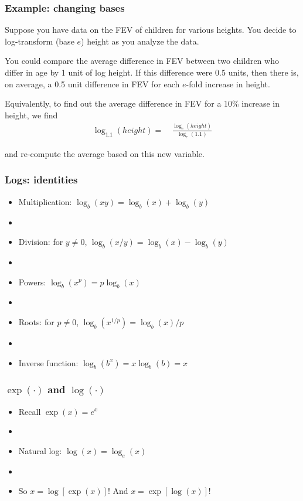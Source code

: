 \documentclass[11pt]{beamer}
\newcommand{\myframe}[1]{\begin{frame} \frametitle{#1}}
\begin{document}
\begin{frame}
\frametitle{Example: changing bases}
Suppose you have data on the FEV of children for various heights. You decide to log-transform (base $e$) height as you analyze the data. \pause

You could compare the average difference in FEV between two children who differ in age by 1 unit of log height. If this difference were 0.5 units, then there is, on average, a 0.5 unit difference in FEV for each $e$-fold increase in height. \pause

Equivalently, to find out the average difference in FEV for a 10\% increase in height, we find \vspace{-0.3cm}
\begin{align*}
\log_{1.1}(height) =& \ \frac{\log_e(height)}{\log_{e}(1.1)}
\end{align*}

and re-compute the average based on this new variable.

\end{frame}

\myframe{Logs: identities}
\begin{itemize}
\item Multiplication: $\log_b(xy) = \log_b(x) + \log_b(y)$
\item[] \pause
\item Division: for $y \neq 0$, $\log_b(x/y) = \log_b(x) - \log_b(y)$
\item[] \pause
\item Powers: $\log_b(x^p) = p \log_b(x)$
\item[] \pause
\item Roots: for $p \neq 0$, $\log_b(x^{1/p}) = \log_b(x)/p$
\item[] \pause
\item Inverse function: $\log_b(b^x) = x\log_b(b) = x$
\end{itemize}
\end{frame}

\myframe{$\exp(\cdot)$ and $\log(\cdot)$}
\begin{itemize}
\item Recall $\exp(x) = e^x$
\item[] \pause
\item Natural log: $\log (x) = \log_e(x)$
\item[] \pause
\item So $x = \log [\exp(x)]$! And $x = \exp[\log(x)]$!
\end{itemize}
\end{frame}
\end{document}
